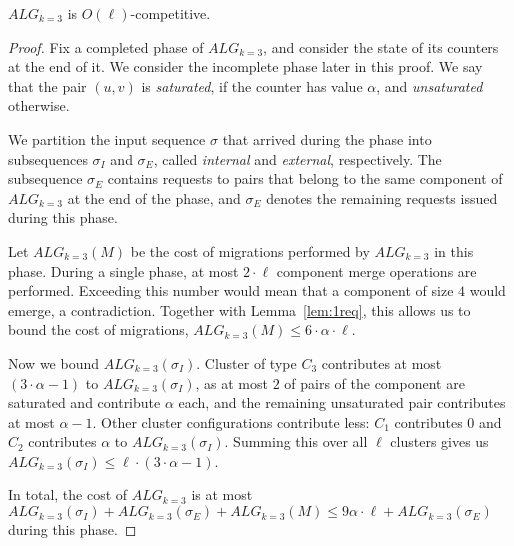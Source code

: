 \documentclass[manuscript,screen=true]{acmart}
\newcommand{\TAlg}{{\ensuremath{ALG_{k=3}}}\xspace} %
\newcommand\maciek[1]{\color{brown}\textbf{\\ Maciek: #1}\color{black}}
\begin{document}
\begin{theorem}
  \TAlg is $O(\ell)$-competitive.
\end{theorem}
\begin{proof}
  Fix a completed phase of \TAlg, and consider the state of its counters at the end of it.
  We consider the incomplete phase later in this proof.
  We say that the pair $(u, v)$ is \emph{saturated}, if the counter has value $\alpha$, and \emph{unsaturated} otherwise.

  We partition the input sequence $\sigma$ that arrived during the phase into subsequences $\sigma_I$ and $\sigma_E$, called \emph{internal} and \emph{external}, respectively.
  The subsequence $\sigma_E$ contains requests to pairs that belong to the same component of \TAlg{} at the end of the phase, and $\sigma_E$ denotes the remaining requests issued during this phase.

  Let $\TAlg(M)$ be the cost of migrations performed by \TAlg in this phase.
  During a single phase, at most $2\cdot \ell$ component merge operations are performed.
  Exceeding this number would mean that a component of size $4$ would emerge, a contradiction.
  Together with Lemma~\ref{lem:1req}, this allows us to bound the cost of migrations, $\TAlg(M) \leq 6\cdot\alpha\cdot\ell$.
  
  Now we bound $\TAlg(\sigma_I)$.
  Cluster of type $C_3$ contributes at most $(3\cdot \alpha - 1)$ to $\TAlg(\sigma_I)$, as at most $2$ of pairs of the component are saturated and contribute $\alpha$ each, and the remaining unsaturated pair contributes at most $\alpha-1$.
  Other cluster configurations contribute less: $C_1$ contributes $0$ and $C_2$ contributes $\alpha$ to $\TAlg(\sigma_I)$.
  Summing this over all $\ell$ clusters gives us $\TAlg(\sigma_I) \leq \ell \cdot (3\cdot \alpha-1)$.


  In total, the cost of \TAlg is at most $\TAlg(\sigma_I) + \TAlg(\sigma_E) + \TAlg(M) \leq 9\alpha\cdot \ell + \TAlg(\sigma_E)$ during this phase.


\end{proof}
\end{document}

